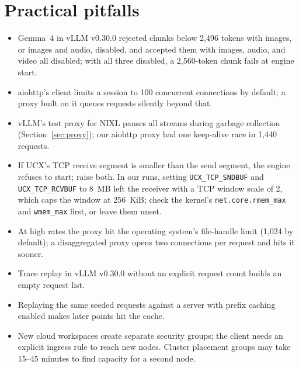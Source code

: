 \documentclass[11pt]{article}
\begin{document}
\section{Practical pitfalls}\label{app:pitfalls}
\begin{itemize}
  \item Gemma~4 in vLLM v0.30.0 rejected chunks below 2,496 tokens with images, or images and audio, disabled, and accepted them with images, audio, and video all disabled; with all three disabled, a 2,560-token chunk fails at engine start.
  \item aiohttp's client limits a session to 100 concurrent connections by default; a proxy built on it queues requests silently beyond that.
  \item vLLM's test proxy for NIXL pauses all streams during garbage collection (Section~\ref{sec:proxy}); our aiohttp proxy had one keep-alive race in 1,440 requests.
  \item If UCX's TCP receive segment is smaller than the send segment, the engine refuses to start; raise both. In our runs, setting \texttt{UCX\_TCP\_SNDBUF} and \texttt{UCX\_TCP\_RCVBUF} to 8~MB left the receiver with a TCP window scale of 2, which caps the window at 256~KiB; check the kernel's \texttt{net.core.rmem\_max} and \texttt{wmem\_max} first, or leave them unset.
  \item At high rates the proxy hit the operating system's file-handle limit (1,024 by default); a disaggregated proxy opens two connections per request and hits it sooner.
  \item Trace replay in vLLM v0.30.0 without an explicit request count builds an empty request list.
  \item Replaying the same seeded requests against a server with prefix caching enabled makes later points hit the cache.
  \item New cloud workspaces create separate security groups; the client needs an explicit ingress rule to reach new nodes. Cluster placement groups may take 15--45 minutes to find capacity for a second node.
\end{itemize}
\end{document}
